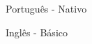 
\begin{cventries}
  \cventry
    {}
    {
      \begin{cvitems} %
        \item {Português - Nativo}
        \item {Inglês - Básico}
      \end{cvitems}
    }
    {} {} {}

\end{cventries}
